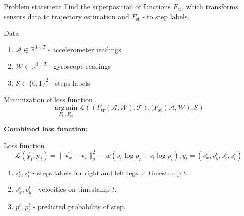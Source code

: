 \documentclass[9pt,pdf,hyperref={unicode}]{beamer}
\DeclareMathOperator*{\argmin}{arg\,min}
\newcommand{\calA}{\mathcal{A}}
\newcommand{\calW}{\mathcal{W}}
\newcommand{\calT}{\mathcal{T}}
\newcommand{\calS}{\mathcal{S}}
\begin{document}
\begin{frame}{Problem statement}
Find the superposition of functions $F_{\text{tr}}$, which transforms sensors data to trajectory estimation and $F_{\text{st}}$ - to step labels.
    \begin{block}{Data}
        \begin{enumerate}
        \item $\calA \in \mathbb{R}^{3\times T}$ - accelerometer readings 
        \item $\calW \in \mathbb{R}^{3\times T}$ - gyroscope readings
        \item $\mathcal{S} \in \{0,1\}^2$ - steps labels
        \end{enumerate}
    \end{block}

    \begin{block}{Minimization of loss function}
        \begin{equation}
            \label{eq:general_ps}
            \argmin\limits_{F_{\text{tr}}, F_{\text{st}}}\mathcal{L}\left(\left(F_{\text{tr}}\left(\calA, \calW\right), \calT\right),(F_{\text{st}}\left(\calA, \calW\right), \calS\right)
        \end{equation}{}
    \end{block}
    \textbf{Combined loss function:}
    \begin{block}{Loss function} 
       \begin{equation*}
            \label{nohyper}
             \mathcal{L}(\hat{\textbf{y}_t}, \textbf{y}_t) =  \|\hat{\textbf{v}_x} - \textbf{v}_t\|_2^2 - w(s_r \log p_r + s_l \log p_l) , y_t = \left( v_x^t , v_y^t, s_r^t, s_l^t\right)
        \end{equation*}
    \end{block}
\begin{enumerate}
\item $s_r^t, s_l^t$ - steps labels for right and left legs at timestamp $t$.
\item $v_x^t, v_y^t$ - velocities on timestamp $t$.
\item $p_r^t, p_l^t$ - predicted probability of step.
\end{enumerate}
\end{frame}
\end{document}
